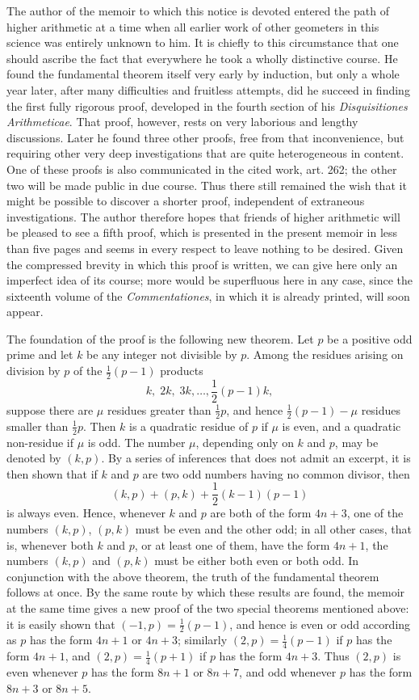 \documentclass[12pt]{article}
\begin{document}
The author of the memoir to which this notice is devoted entered the path of higher arithmetic at a time when all earlier work of other geometers in this science was entirely unknown to him. It is chiefly to this circumstance that one should ascribe the fact that everywhere he took a wholly distinctive course. He found the fundamental theorem itself very early by induction, but only a whole year later, after many difficulties and fruitless attempts, did he succeed in finding the first fully rigorous proof, developed in the fourth section of his \textit{Disquisitiones Arithmeticae}. That proof, however, rests on very laborious and lengthy discussions. Later he found three other proofs, free from that inconvenience, but requiring other very deep investigations that are quite heterogeneous in content. One of these proofs is also communicated in the cited work, art. 262; the other two will be made public in due course. Thus there still remained the wish that it might be possible to discover a shorter proof, independent of extraneous investigations. The author therefore hopes that friends of higher arithmetic will be pleased to see a fifth proof, which is presented in the present memoir in less than five pages and seems in every respect to leave nothing to be desired. Given the compressed brevity in which this proof is written, we can give here only an imperfect idea of its course; more would be superfluous here in any case, since the sixteenth volume of the \textit{Commentationes}, in which it is already printed, will soon appear.

The foundation of the proof is the following new theorem. Let $p$ be a positive odd prime and let $k$ be any integer not divisible by $p$. Among the residues arising on division by $p$ of the $\frac12(p-1)$ products
\[
 k,\;2k,\;3k,\ldots,\frac12(p-1)k,
\]
suppose there are $\mu$ residues greater than $\frac12p$, and hence $\frac12(p-1)-\mu$ residues smaller than $\frac12p$. Then $k$ is a quadratic residue of $p$ if $\mu$ is even, and a quadratic non-residue if $\mu$ is odd. The number $\mu$, depending only on $k$ and $p$, may be denoted by $(k,p)$. By a series of inferences that does not admit an excerpt, it is then shown that if $k$ and $p$ are two odd numbers having no common divisor, then
\[
(k,p)+(p,k)+\frac12(k-1)(p-1)
\]
is always even. Hence, whenever $k$ and $p$ are both of the form $4n+3$, one of the numbers $(k,p)$, $(p,k)$ must be even and the other odd; in all other cases, that is, whenever both $k$ and $p$, or at least one of them, have the form $4n+1$, the numbers $(k,p)$ and $(p,k)$ must be either both even or both odd. In conjunction with the above theorem, the truth of the fundamental theorem follows at once. By the same route by which these results are found, the memoir at the same time gives a new proof of the two special theorems mentioned above: it is easily shown that $(-1,p)=\frac12(p-1)$, and hence is even or odd according as $p$ has the form $4n+1$ or $4n+3$; similarly $(2,p)=\frac14(p-1)$ if $p$ has the form $4n+1$, and $(2,p)=\frac14(p+1)$ if $p$ has the form $4n+3$. Thus $(2,p)$ is even whenever $p$ has the form $8n+1$ or $8n+7$, and odd whenever $p$ has the form $8n+3$ or $8n+5$.
\end{document}
